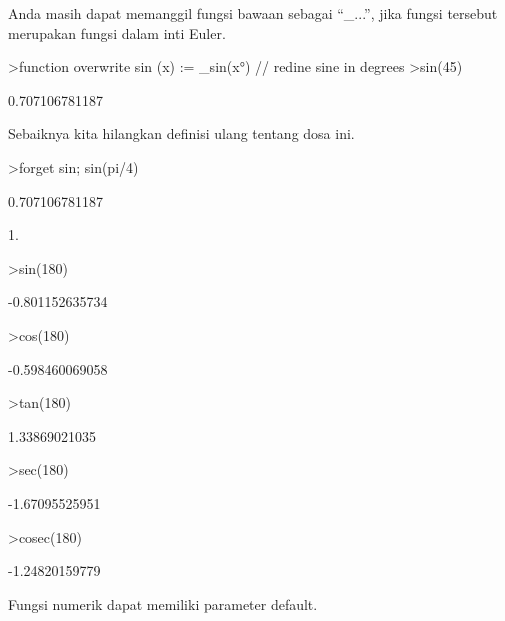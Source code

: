 \documentclass[a4paper,10pt]{article}
\begin{document}
\begin{eulernotebook}
\begin{eulercomment}
\begin{eulercomment}
\begin{eulercomment}
\begin{eulercomment}
\begin{eulercomment}
Anda masih dapat memanggil fungsi bawaan sebagai “\_...”, jika fungsi
tersebut merupakan fungsi dalam inti Euler.
\end{eulercomment}
\begin{eulerprompt}
>function overwrite sin (x) := _sin(x°) // redine sine in degrees
>sin(45)
\end{eulerprompt}
\begin{euleroutput}
  0.707106781187
\end{euleroutput}
\begin{eulercomment}
Sebaiknya kita hilangkan definisi ulang tentang dosa ini.
\end{eulercomment}
\begin{eulerprompt}
>forget sin; sin(pi/4)
\end{eulerprompt}
\begin{euleroutput}
  0.707106781187
\end{euleroutput}
\begin{eulercomment}
1.
\end{eulercomment}
\begin{eulerprompt}
>sin(180)
\end{eulerprompt}
\begin{euleroutput}
  -0.801152635734
\end{euleroutput}
\begin{eulerprompt}
>cos(180)
\end{eulerprompt}
\begin{euleroutput}
  -0.598460069058
\end{euleroutput}
\begin{eulerprompt}
>tan(180)
\end{eulerprompt}
\begin{euleroutput}
  1.33869021035
\end{euleroutput}
\begin{eulerprompt}
>sec(180)
\end{eulerprompt}
\begin{euleroutput}
  -1.67095525951
\end{euleroutput}
\begin{eulerprompt}
>cosec(180)
\end{eulerprompt}
\begin{euleroutput}
  -1.24820159779
\end{euleroutput}
\begin{eulercomment}
Fungsi numerik dapat memiliki parameter default.
\end{eulercomment}

\end{eulercomment}
\end{eulercomment}
\end{eulercomment}
\end{eulercomment}
\end{eulernotebook}
\end{document}
